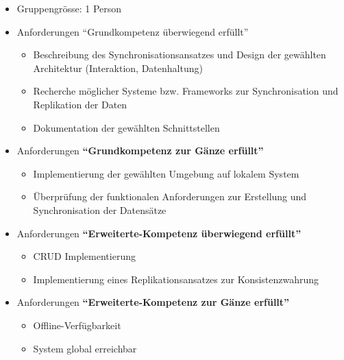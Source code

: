 \begin{itemize}
	\item Gruppengrösse: 1 Person
	\item Anforderungen ``Grundkompetenz überwiegend erfüllt''
	\begin{itemize}
		\item Beschreibung des Synchronisationsansatzes und Design der gewählten Architektur (Interaktion, Datenhaltung)
		\item Recherche möglicher Systeme bzw. Frameworks zur Synchronisation und Replikation der Daten
		\item Dokumentation der gewählten Schnittstellen
	\end{itemize}
	
	\item Anforderungen \textbf{``Grundkompetenz zur Gänze erfüllt''}
	\begin{itemize}
		\item Implementierung der gewählten Umgebung auf lokalem System
		\item Überprüfung der funktionalen Anforderungen zur Erstellung und Synchronisation der Datensätze
	\end{itemize}
	
	\item Anforderungen \textbf{``Erweiterte-Kompetenz überwiegend erfüllt''}
	\begin{itemize}
		\item CRUD Implementierung
		\item Implementierung eines Replikationsansatzes zur Konsistenzwahrung
	\end{itemize}
	
	\item Anforderungen \textbf{``Erweiterte-Kompetenz zur Gänze erfüllt''}
	\begin{itemize}
		\item Offline-Verfügbarkeit
		\item System global erreichbar
	\end{itemize}
\end{itemize}

\clearpage

